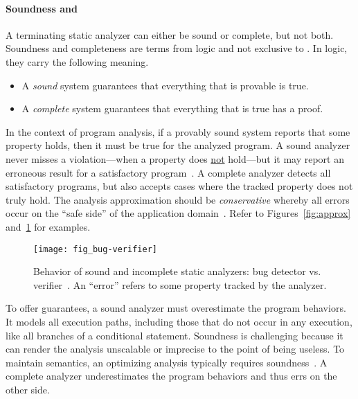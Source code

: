\paragraph*{Soundness and }
A terminating static analyzer can either be sound or complete, but not both.
Soundness and completeness are terms from logic and not exclusive to .
In logic, they carry the following meaning.
\begin{itemize}
\item A \emph{sound} system guarantees that everything that is provable is true.
\item A \emph{complete} system guarantees that everything that is true has a proof.
\end{itemize}
In the context of program analysis,
if a provably sound system reports that some property holds, then it must be true for the analyzed program.
A sound analyzer never misses a violation---\ie when a property does \underline{not} hold---but it may report an erroneous result for a satisfactory program~\cite{torlak2015}.
A complete analyzer detects all satisfactory programs, but also accepts cases where the tracked property does not truly hold.
The analysis approximation should be \emph{conservative}
whereby all errors occur on the \enquote{safe side} of the application domain~\cite[p. 5]{moller2023}.
Refer to Figures~\ref{fig:approx} and~\ref{fig:bug-verify} for examples.

\begin{figure}[t]
\centering
\texttt{[image: fig\_bug-verifier]}
\caption[Sound and incomplete bug detector vs. verifier]{
Behavior of sound and incomplete static analyzers: bug detector vs. verifier~\cite{moller2024}.
An \enquote{error} refers to some property tracked by the analyzer.}
\label{fig:bug-verify}
\end{figure}

To offer guarantees, a sound analyzer must overestimate the program behaviors.
It models all execution paths, including those that do not occur in any execution, like all branches of a conditional statement.
Soundness is challenging because it can render the analysis unscalable or imprecise to the point of being useless.
To maintain semantics, an optimizing analysis typically requires soundness~\cite[p. 5]{moller2023}.
A complete analyzer underestimates the program behaviors and thus errs on the other side.

